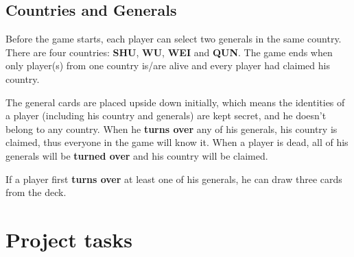 \documentclass[11pt,a4paper]{article}
\begin{document}
\subsection{Countries and Generals}

Before the game starts, each player can select two generals in the same country. There are four countries: \textbf{SHU}, \textbf{WU}, \textbf{WEI} and \textbf{QUN}. The game ends when only player(s) from one country is/are alive and every player had claimed his country. \bigskip

The general cards are placed upside down initially, which means the identities of a player (including his country and generals) are kept secret, and he doesn't belong to any country. When he \textbf{turns over} any of his generals, his country is claimed, thus everyone in the game will know it. When a player is dead, all of his generals will be \textbf{turned over} and his country will be claimed. \bigskip

If a player first \textbf{turns over} at least one of his generals, he can draw three cards from the deck.



\section{Project tasks}
\end{document}
